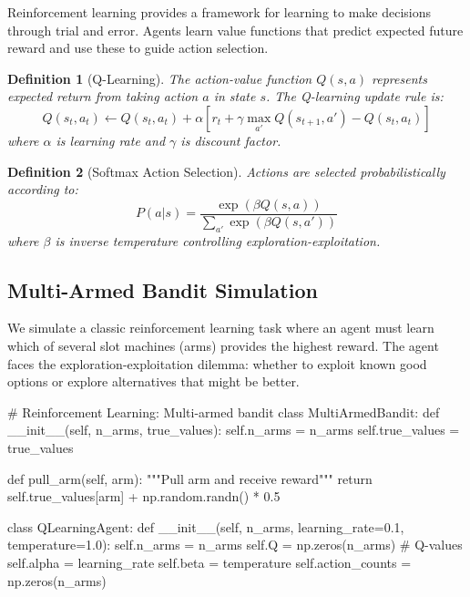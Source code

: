 \documentclass[a4paper, 11pt]{article}
\newtheorem{definition}{Definition}[section]
\begin{document}
{{Reinforcement learning provides a framework for learning to make decisions through trial and error.
Agents learn value functions that predict expected future reward and use these to guide action selection.

\begin{definition}[Q-Learning]
The action-value function $Q(s, a)$ represents expected return from taking action $a$ in state $s$.
The Q-learning update rule is:
\begin{equation}
Q(s_t, a_t) \leftarrow Q(s_t, a_t) + \alpha \left[ r_t + \gamma \max_{a'} Q(s_{t+1}, a') - Q(s_t, a_t) \right]
\end{equation}
where $\alpha$ is learning rate and $\gamma$ is discount factor.
\end{definition}

\begin{definition}[Softmax Action Selection]
Actions are selected probabilistically according to:
\begin{equation}
P(a|s) = \frac{\exp(\beta Q(s,a))}{\sum_{a'} \exp(\beta Q(s,a'))}
\end{equation}
where $\beta$ is inverse temperature controlling exploration-exploitation.
\end{definition}

\subsection{Multi-Armed Bandit Simulation}

We simulate a classic reinforcement learning task where an agent must learn which of several slot
machines (arms) provides the highest reward. The agent faces the exploration-exploitation dilemma:
whether to exploit known good options or explore alternatives that might be better.

\begin{pycode}
# Reinforcement Learning: Multi-armed bandit
class MultiArmedBandit:
    def __init__(self, n_arms, true_values):
        self.n_arms = n_arms
        self.true_values = true_values

    def pull_arm(self, arm):
        """Pull arm and receive reward"""
        return self.true_values[arm] + np.random.randn() * 0.5

class QLearningAgent:
    def __init__(self, n_arms, learning_rate=0.1, temperature=1.0):
        self.n_arms = n_arms
        self.Q = np.zeros(n_arms)  # Q-values
        self.alpha = learning_rate
        self.beta = temperature
        self.action_counts = np.zeros(n_arms)


\end{pycode}}}
\end{document}
